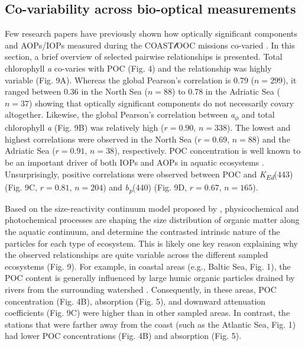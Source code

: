 \documentclass[essd, manuscript]{copernicus}
\begin{document}
\subsection{Co-variability across bio-optical measurements}

Few research papers have previously shown how optically significant components and AOPs/IOPs measured during the COAST$\mathscr{l}$OOC missions co-varied \citep{Ferrari2000, Ferrari2003, Babin2003b, Babin2003a}. In this section, a brief overview of selected pairwise relationships is presented. Total chlorophyll \textit{a} co-varies with POC (Fig. 4) and the relationship was highly variable (Fig. 9A). Whereas the global Pearson's correlation is 0.79 ($n = 299$), it ranged between 0.36 in the North Sea ($n = 88$) to 0.78 in the Adriatic Sea ($n = 37$) showing that optically significant components do not necessarily covary altogether. Likewise, the global Pearson's correlation between \textit{a\textsubscript{$\phi$}} and total chlorophyll \textit{a} (Fig. 9B) was relatively high ($r = 0.90$, $n = 338$). The lowest and highest correlations were observed in the North Sea ($r = 0.69$, $n = 88$) and the Adriatic Sea ($r = 0.91$, $n = 38$), respectively. POC concentration is well known to be an important driver of both IOPs and AOPs in aquatic ecosystems \citep{Stramski2008, Cetinic2012a}. Unsurprisingly, positive correlations were observed between POC and \textit{K\textsubscript{Ed}}(443) (Fig. 9C, $r = 0.81$, $n = 204$) and \textit{b\textsubscript{p}}(440) (Fig. 9D, $r = 0.67$, $n = 165$).

Based on the size-reactivity continuum model proposed by \citealt{Benner2015}, physicochemical and photochemical processes are shaping the size distribution of organic matter along the aquatic continuum, and determine the contrasted intrinsic nature of the particles for each type of ecosystem. This is likely one key reason explaining why the observed relationships are quite variable across the different sampled ecosystems (Fig. 9). For example, in coastal areas (e.g., Baltic Sea, Fig. 1), the POC content is generally influenced by large humic organic particles drained by rivers from the surrounding watershed \citep{Babin2003a}. Consequently, in these areas, POC concentration (Fig. 4B), absorption (Fig. 5), and downward attenuation coefficients (Fig. 9C) were higher than in other sampled areas. In contrast, the stations that were farther away from the coast (such as the Atlantic Sea, Fig. 1) had lower POC concentrations (Fig. 4B) and absorption (Fig. 5).
\end{document}
